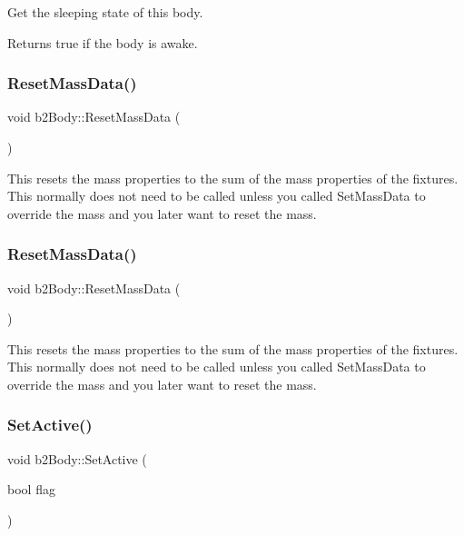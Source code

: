 Get the sleeping state of this body. \begin{DoxyReturn}{Returns}
true if the body is awake. 
\end{DoxyReturn}
\mbox{\label{classb2Body_a109d8567c6ae84c61fce2919fb209c63}} 
\subsubsection{\texorpdfstring{Reset\+Mass\+Data()}{ResetMassData()}\hspace{0.1cm}{\footnotesize\ttfamily [1/2]}}
{\footnotesize\ttfamily void b2\+Body\+::\+Reset\+Mass\+Data (\begin{DoxyParamCaption}{ }\end{DoxyParamCaption})}

This resets the mass properties to the sum of the mass properties of the fixtures. This normally does not need to be called unless you called Set\+Mass\+Data to override the mass and you later want to reset the mass. \mbox{\label{classb2Body_a109d8567c6ae84c61fce2919fb209c63}} 
\subsubsection{\texorpdfstring{Reset\+Mass\+Data()}{ResetMassData()}\hspace{0.1cm}{\footnotesize\ttfamily [2/2]}}
{\footnotesize\ttfamily void b2\+Body\+::\+Reset\+Mass\+Data (\begin{DoxyParamCaption}{ }\end{DoxyParamCaption})}

This resets the mass properties to the sum of the mass properties of the fixtures. This normally does not need to be called unless you called Set\+Mass\+Data to override the mass and you later want to reset the mass. \mbox{\label{classb2Body_ab8059b7b3e3b64aee17b54f68f7dde80}} 
\subsubsection{\texorpdfstring{Set\+Active()}{SetActive()}\hspace{0.1cm}{\footnotesize\ttfamily [1/2]}}
{\footnotesize\ttfamily void b2\+Body\+::\+Set\+Active (\begin{DoxyParamCaption}\item[{bool}]{flag }\end{DoxyParamCaption})}

